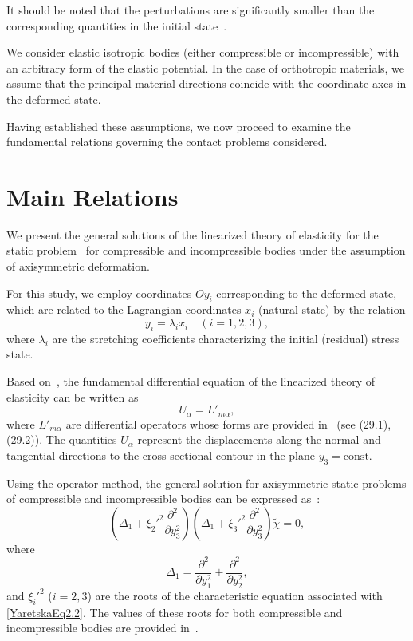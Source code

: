 It should be noted that the perturbations are significantly smaller than the corresponding quantities in the initial state~\cite{YaretskaRef1}.

We consider elastic isotropic bodies (either compressible or incompressible) with an arbitrary form of the elastic potential. In the case of orthotropic materials, we assume that the principal material directions coincide with the coordinate axes in the deformed state.

Having established these assumptions, we now proceed to examine the fundamental relations governing the contact problems considered.

\section{Main Relations}

We present the general solutions of the linearized theory of elasticity for the static problem~\cite{YaretskaRef1,YaretskaRef10} for compressible and incompressible bodies under the assumption of axisymmetric deformation.

For this study, we employ coordinates $O y_i$ corresponding to the deformed state, which are related to the Lagrangian coordinates $x_i$ (natural state) by the relation
\[
y_i = \lambda_i x_i \quad (i = 1, 2, 3),
\]
where $\lambda_i$ are the stretching coefficients characterizing the initial (residual) stress state.

Based on~\cite{YaretskaRef1}, the fundamental differential equation of the linearized theory of elasticity can be written as
\begin{equation} \label{YaretskaEq2.1}
	U_\alpha = L'_{m\alpha},
\end{equation}
where $L'_{m\alpha}$ are differential operators whose forms are provided in~\cite{YaretskaRef18} (see (29.1), (29.2)). The quantities $U_\alpha$ represent the displacements along the normal and tangential directions to the cross-sectional contour in the plane $y_3 = \text{const}$.

Using the operator method, the general solution for axisymmetric static problems of compressible and incompressible bodies can be expressed as~\cite{YaretskaRef1}:
\begin{equation} \label{YaretskaEq2.2}
	\left( \Delta_1 + \xi_2'^2 \frac{\partial^2}{\partial y_3^2} \right)
	\left( \Delta_1 + \xi_3'^2 \frac{\partial^2}{\partial y_3^2} \right) \tilde{\chi} = 0,
\end{equation}
where
\[
\Delta_1 = \frac{\partial^2}{\partial y_1^2} + \frac{\partial^2}{\partial y_2^2},
\]
and $\xi_i'^2$ ($i=2,3$) are the roots of the characteristic equation associated with \eqref{YaretskaEq2.2}. The values of these roots for both compressible and incompressible bodies are provided in~\cite{YaretskaRef1}.

